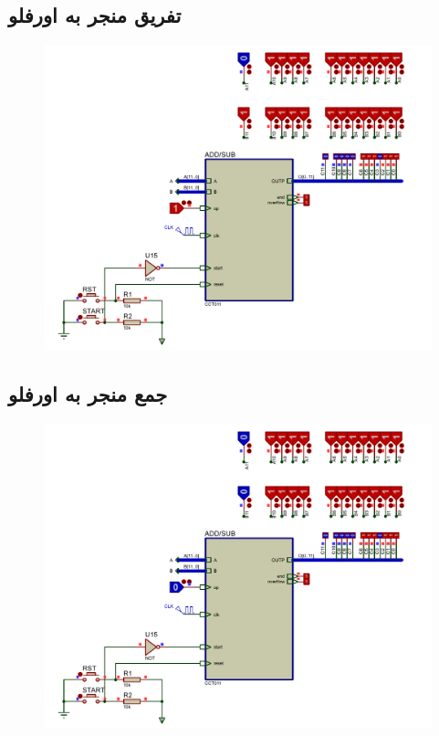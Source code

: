 \documentclass{article}
\begin{document}
\subsection{تفریق منجر به اورفلو}
\begin{figure}[H]
	\centering
	\includegraphics[scale=0.5]{./graphics/tests/subtraction_causing_overflow}
\end{figure}


\subsection{جمع منجر به اورفلو}
\begin{figure}[H]
	\centering
	\includegraphics[scale=0.5]{./graphics/tests/addition_causing_overflow}
\end{figure}
\end{document}
